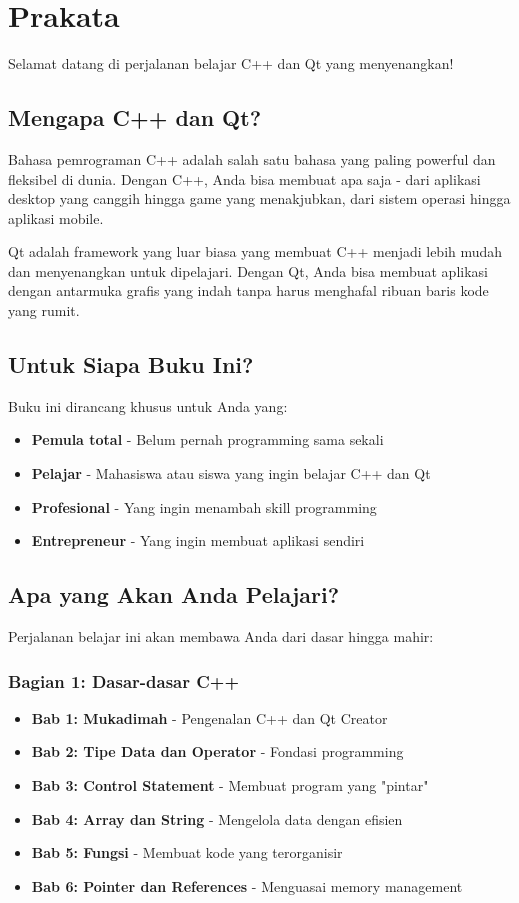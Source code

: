 \chapter*{Prakata}

Selamat datang di perjalanan belajar C++ dan Qt yang menyenangkan!

\section*{Mengapa C++ dan Qt?}

Bahasa pemrograman C++ adalah salah satu bahasa yang paling powerful dan fleksibel di dunia. Dengan C++, Anda bisa membuat apa saja - dari aplikasi desktop yang canggih hingga game yang menakjubkan, dari sistem operasi hingga aplikasi mobile.

Qt adalah framework yang luar biasa yang membuat C++ menjadi lebih mudah dan menyenangkan untuk dipelajari. Dengan Qt, Anda bisa membuat aplikasi dengan antarmuka grafis yang indah tanpa harus menghafal ribuan baris kode yang rumit.

\section*{Untuk Siapa Buku Ini?}

Buku ini dirancang khusus untuk Anda yang:
\begin{itemize}
\item \textbf{Pemula total} - Belum pernah programming sama sekali
\item \textbf{Pelajar} - Mahasiswa atau siswa yang ingin belajar C++ dan Qt
\item \textbf{Profesional} - Yang ingin menambah skill programming
\item \textbf{Entrepreneur} - Yang ingin membuat aplikasi sendiri
\end{itemize}

\section*{Apa yang Akan Anda Pelajari?}

Perjalanan belajar ini akan membawa Anda dari dasar hingga mahir:

\subsection*{Bagian 1: Dasar-dasar C++}
\begin{itemize}
\item \textbf{Bab 1: Mukadimah} - Pengenalan C++ dan Qt Creator
\item \textbf{Bab 2: Tipe Data dan Operator} - Fondasi programming
\item \textbf{Bab 3: Control Statement} - Membuat program yang "pintar"
\item \textbf{Bab 4: Array dan String} - Mengelola data dengan efisien
\item \textbf{Bab 5: Fungsi} - Membuat kode yang terorganisir
\item \textbf{Bab 6: Pointer dan References} - Menguasai memory management
\end{itemize}

